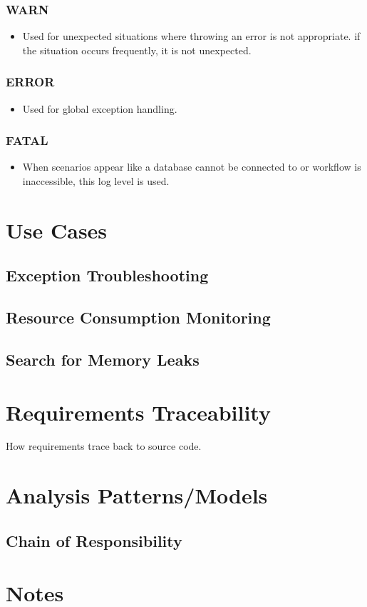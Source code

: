 \documentclass[12pt]{report}
\begin{document}
\subsubsection{WARN}
\begin{itemize}
  \item Used for unexpected situations where throwing an error is not appropriate. if the situation occurs frequently, it is not unexpected.
\end{itemize}

\subsubsection{ERROR}
\begin{itemize}
  \item Used for global exception handling.
\end{itemize}

\subsubsection{FATAL}
\begin{itemize}
  \item When scenarios appear like a database cannot be connected to or workflow is inaccessible, this log level is used.
\end{itemize}

\section{Use Cases}
\subsection{Exception Troubleshooting}
\subsection{Resource Consumption Monitoring}
\subsection{Search for Memory Leaks}
\section{Requirements Traceability}
How requirements trace back to source code.
\section{Analysis Patterns/Models}
\subsection{Chain of Responsibility}
\section{Notes}
\end{document}
